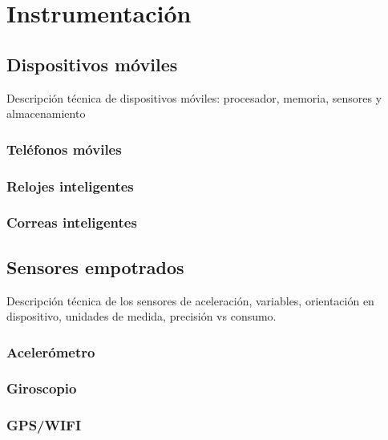 
\chapter{Instrumentación}

\section{Dispositivos móviles}

\label{ssec46:dispositivos-moviles}Descripción técnica de dispositivos
móviles: procesador, memoria, sensores y almacenamiento

\subsection{Teléfonos móviles}

\subsection{Relojes inteligentes}

\subsection{Correas inteligentes}

\section{Sensores empotrados}

\label{ssec46:sensores-empotrados}Descripción técnica de los sensores
de aceleración, variables, orientación en dispositivo, unidades de
medida, precisión vs consumo.

\subsection{Acelerómetro}

\subsection{Giroscopio}

\subsection{GPS/WIFI}
